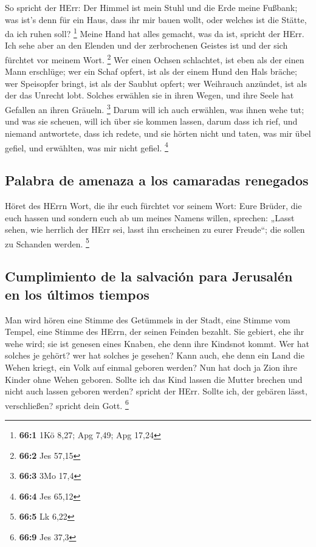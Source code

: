  So spricht der HErr: Der Himmel ist mein Stuhl und die
Erde meine Fußbank; was ist's denn für ein Haus, dass ihr mir bauen
wollt, oder welches ist die Stätte, da ich ruhen soll? \footnote{\textbf{66:1}
  1Kö 8,27; Apg 7,49; Apg 17,24}  Meine Hand hat alles
gemacht, was da ist, spricht der HErr. Ich sehe aber an den Elenden und
der zerbrochenen Geistes ist und der sich fürchtet vor meinem Wort.
\footnote{\textbf{66:2} Jes 57,15}  Wer einen Ochsen
schlachtet, ist eben als der einen Mann erschlüge; wer ein Schaf opfert,
ist als der einem Hund den Hals bräche; wer Speisopfer bringt, ist als
der Saublut opfert; wer Weihrauch anzündet, ist als der das Unrecht
lobt. Solches erwählen sie in ihren Wegen, und ihre Seele hat Gefallen
an ihren Gräueln. \footnote{\textbf{66:3} 3Mo 17,4}  Darum
will ich auch erwählen, was ihnen wehe tut; und was sie scheuen, will
ich über sie kommen lassen, darum dass ich rief, und niemand antwortete,
dass ich redete, und sie hörten nicht und taten, was mir übel gefiel,
und erwählten, was mir nicht gefiel. \footnote{\textbf{66:4} Jes 65,12}

\hypertarget{palabra-de-amenaza-a-los-camaradas-renegados}{%
\subsection{Palabra de amenaza a los camaradas
renegados}\label{palabra-de-amenaza-a-los-camaradas-renegados}}

 Höret des HErrn Wort, die ihr euch fürchtet vor seinem
Wort: Eure Brüder, die euch hassen und sondern euch ab um meines Namens
willen, sprechen: „Lasst sehen, wie herrlich der HErr sei, lasst ihn
erscheinen zu eurer Freude``; die sollen zu Schanden werden. \footnote{\textbf{66:5}
  Lk 6,22}

\hypertarget{cumplimiento-de-la-salvaciuxf3n-para-jerusaluxe9n-en-los-uxfaltimos-tiempos}{%
\subsection{Cumplimiento de la salvación para Jerusalén en los últimos
tiempos}\label{cumplimiento-de-la-salvaciuxf3n-para-jerusaluxe9n-en-los-uxfaltimos-tiempos}}

 Man wird hören eine Stimme des Getümmels in der Stadt,
eine Stimme vom Tempel, eine Stimme des HErrn, der seinen Feinden
bezahlt.  Sie gebiert, ehe ihr wehe wird; sie ist genesen
eines Knaben, ehe denn ihre Kindsnot kommt.  Wer hat
solches je gehört? wer hat solches je gesehen? Kann auch, ehe denn ein
Land die Wehen kriegt, ein Volk auf einmal geboren werden? Nun hat doch
ja Zion ihre Kinder ohne Wehen geboren.  Sollte ich das
Kind lassen die Mutter brechen und nicht auch lassen geboren werden?
spricht der HErr. Sollte ich, der gebären lässt, verschließen? spricht
dein Gott. \footnote{\textbf{66:9} Jes 37,3}

